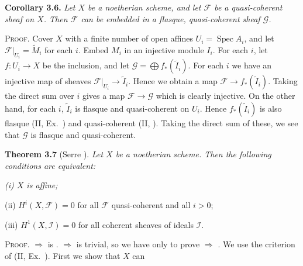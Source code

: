 {\medskip
\noindent\hypertarget{result-III-3.6}{}\textbf{Corollary 3.6.} \emph{Let $X$ be a noetherian scheme, and let $\mathcal F$ be a quasi-coherent sheaf on $X$. Then $\mathcal F$ can be embedded in a flasque, quasi-coherent sheaf $\mathcal G$.}

\smallskip
\noindent\textsc{Proof.} Cover $X$ with a finite number of open affines $U_i=\operatorname{Spec}A_i$, and let $\mathcal F|_{U_i}=\widetilde M_i$ for each $i$. Embed $M_i$ in an injective module $I_i$. For each $i$, let $f\colon U_i\to X$ be the inclusion, and let $\mathcal G=\bigoplus f_*(\widetilde I_i)$. For each $i$ we have an injective map of sheaves $\mathcal F|_{U_i}\to\widetilde I_i$. Hence we obtain a map $\mathcal F\to f_*(\widetilde I_i)$. Taking the direct sum over $i$ gives a map $\mathcal F\to\mathcal G$ which is clearly injective. On the other hand, for each $i$, $\widetilde I_i$ is flasque  and quasi-coherent on $U_i$. Hence $f_*(\widetilde I_i)$ is also flasque (II, Ex.~) and quasi-coherent (II, ). Taking the direct sum of these, we see that $\mathcal G$ is flasque and quasi-coherent.

\medskip
\noindent\hypertarget{result-III-3.7}{}\textbf{Theorem 3.7} (Serre ). \emph{Let $X$ be a noetherian scheme. Then the following conditions are equivalent:}
\par{\itshape\leftskip=12pt
\hypertarget{result-III-3.7-i}{}(i) $X$ is affine;

\hypertarget{result-III-3.7-ii}{}(ii) $H^i(X,\mathcal F)=0$ for all $\mathcal F$ quasi-coherent and all $i>0$;

\hypertarget{result-III-3.7-iii}{}(iii) $H^1(X,\mathcal I)=0$ for all coherent sheaves of ideals $\mathcal I$.\par}

\smallskip
\noindent\textsc{Proof.}  $\Rightarrow$  is .  $\Rightarrow$  is trivial, so we have only to prove  $\Rightarrow$ . We use the criterion of (II, Ex.~). First we show that $X$ can
}
